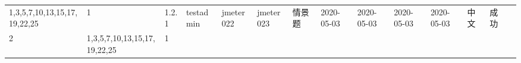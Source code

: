 \documentclass[hyperref, a4paper]{ctexart}
\begin{document}
\begin{longtable}[]{@{}llllllllllllll@{}}
\begin{minipage}[t]{0.12\columnwidth}
1,3,5,7,10,13,15,17,19,22,25\strut
\end{minipage} & \begin{minipage}[t]{0.03\columnwidth}\raggedright
1\strut
\end{minipage} & \begin{minipage}[t]{0.06\columnwidth}\raggedright
1.2.1\strut
\end{minipage} & \begin{minipage}[t]{0.04\columnwidth}\raggedright
testadmin\strut
\end{minipage} & \begin{minipage}[t]{0.04\columnwidth}\raggedright
jmeter022\strut
\end{minipage} & \begin{minipage}[t]{0.04\columnwidth}\raggedright
jmeter023\strut
\end{minipage} & \begin{minipage}[t]{0.02\columnwidth}\raggedright
情景题\strut
\end{minipage} & \begin{minipage}[t]{0.04\columnwidth}\raggedright
2020-05-03\strut
\end{minipage} & \begin{minipage}[t]{0.05\columnwidth}\raggedright
2020-05-03\strut
\end{minipage} & \begin{minipage}[t]{0.07\columnwidth}\raggedright
2020-05-03\strut
\end{minipage} & \begin{minipage}[t]{0.08\columnwidth}\raggedright
2020-05-03\strut
\end{minipage} & \begin{minipage}[t]{0.04\columnwidth}\raggedright
中文\strut
\end{minipage} & \begin{minipage}[t]{0.02\columnwidth}\raggedright
成功\strut
\end{minipage}\tabularnewline
\begin{minipage}[t]{0.01\columnwidth}\raggedright
2\strut
\end{minipage} & \begin{minipage}[t]{0.12\columnwidth}\raggedright
1,3,5,7,10,13,15,17,19,22,25\strut
\end{minipage} & \begin{minipage}[t]{0.03\columnwidth}\raggedright
1\strut
\end{minipage} & \begin{minipage}[t]{0.06\columnwidth}\raggedright

\end{minipage}
\end{longtable}
\end{document}
